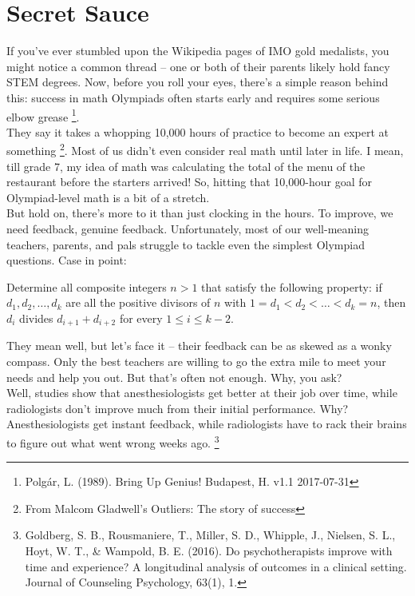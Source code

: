 \section{Secret Sauce}
If you've ever stumbled upon the Wikipedia pages of IMO gold medalists, you might notice a common thread – one or both of their parents likely hold fancy STEM degrees. Now, before you roll your eyes, there's a simple reason behind this: success in math Olympiads often starts early and requires some serious elbow grease \footnote{Polgár, L. (1989). Bring Up Genius! Budapest, H. v1.1 2017-07-31}.\\
They say it takes a whopping 10,000 hours of practice to become an expert at something \footnote{From Malcom Gladwell's Outliers: The story of success}. Most of us didn't even consider real math until later in life. I mean, till grade 7, my idea of math was calculating the total of the menu of the restaurant before the starters arrived! So, hitting that 10,000-hour goal for Olympiad-level math is a bit of a stretch.\\
But hold on, there's more to it than just clocking in the hours. To improve, we need feedback, genuine feedback. Unfortunately, most of our well-meaning teachers, parents, and pals struggle to tackle even the simplest Olympiad questions. Case in point:\\
\begin{example}[IMO 2023, P1]
Determine all composite integers $n>1$ that satisfy the following property: if $d_1,d_2,\dots,d_k$ are all the positive divisors of $n$ with $1=d_1<d_2<\dots<d_k=n$, then $d_i$ divides $d_{i+1}+d_{i+2}$ for every $1\le i \le k-2$.
\end{example}
They mean well, but let's face it – their feedback can be as skewed as a wonky compass. Only the best teachers are willing to go the extra mile to meet your needs and help you out. But that's often not enough. Why, you ask?\\
Well, studies show that anesthesiologists get better at their job over time, while radiologists don't improve much from their initial performance. Why? Anesthesiologists get instant feedback, while radiologists have to rack their brains to figure out what went wrong weeks ago. \footnote{Goldberg, S. B., Rousmaniere, T., Miller, S. D., Whipple, J., Nielsen, S. L., Hoyt, W. T., \& Wampold, B. E. (2016). Do psychotherapists improve with time and experience? A longitudinal analysis of outcomes in a clinical setting. Journal of Counseling Psychology, 63(1), 1.}\\
